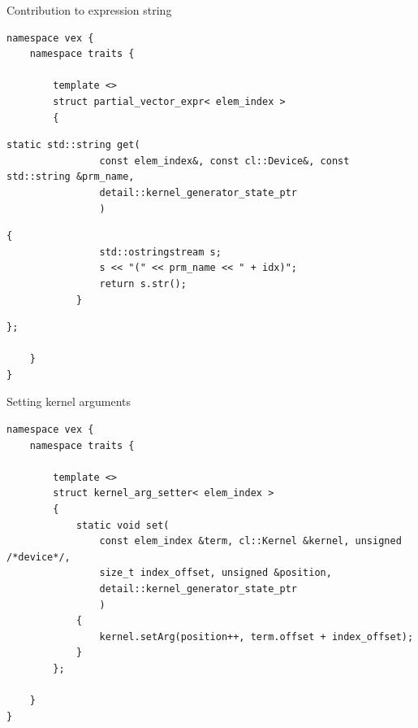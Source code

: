 \documentclass[@BEAMER_OPTIONS@]{beamer}
\begin{document}
\begin{frame}[fragile]{Contribution to expression string}
    \begin{exampleblock}{}
            \begin{lstlisting}
namespace vex {
    namespace traits {

        template <>
        struct partial_vector_expr< elem_index >
        {
            \end{lstlisting}
            \begin{lstlisting}[firstnumber=last]
            static std::string get(
                const elem_index&, const cl::Device&, const std::string &prm_name,
                detail::kernel_generator_state_ptr
                )
            \end{lstlisting}
            \begin{lstlisting}[firstnumber=last]
            {
                std::ostringstream s;
                s << "(" << prm_name << " + idx)";
                return s.str();
            }
            \end{lstlisting}
            \begin{lstlisting}[firstnumber=last]
        };

    }
}
            \end{lstlisting}
    \end{exampleblock}
\end{frame}

\note{ }

\begin{frame}[fragile]{Setting kernel arguments}
    \begin{exampleblock}{}
        \begin{lstlisting}
namespace vex {
    namespace traits {

        template <>
        struct kernel_arg_setter< elem_index >
        {
            static void set(
                const elem_index &term, cl::Kernel &kernel, unsigned /*device*/,
                size_t index_offset, unsigned &position,
                detail::kernel_generator_state_ptr
                )
            {
                kernel.setArg(position++, term.offset + index_offset);
            }
        };

    }
}
        \end{lstlisting}
    \end{exampleblock}
\end{frame}
\end{document}
